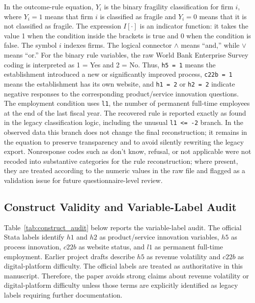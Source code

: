 In the outcome-rule equation, $Y_i$ is the binary fragility classification for firm $i$, where $Y_i = 1$ means that firm $i$ is classified as fragile and $Y_i = 0$ means that it is not classified as fragile. The expression $I[\cdot]$ is an indicator function: it takes the value 1 when the condition inside the brackets is true and 0 when the condition is false. The symbol $i$ indexes firms. The logical connector $\land$ means ``and,'' while $\lor$ means ``or.'' For the binary rule variables, the raw World Bank Enterprise Survey coding is interpreted as 1 = Yes and 2 = No. Thus, \texttt{h5 = 1} means the establishment introduced a new or significantly improved process, \texttt{c22b = 1} means the establishment has its own website, and \texttt{h1 = 2} or \texttt{h2 = 2} indicate negative responses to the corresponding product/service innovation questions. The employment condition uses \texttt{l1}, the number of permanent full-time employees at the end of the last fiscal year. The recovered rule is reported exactly as found in the legacy classification logic, including the unusual \texttt{l1 <= -2} branch. In the observed data this branch does not change the final reconstruction; it remains in the equation to preserve transparency and to avoid silently rewriting the legacy export. Nonresponse codes such as don't know, refusal, or not applicable were not recoded into substantive categories for the rule reconstruction; where present, they are treated according to the numeric values in the raw file and flagged as a validation issue for future questionnaire-level review.

\subsection{Construct Validity and Variable-Label Audit}

Table~\ref{tab:construct_audit} below reports the variable-label audit. The official Stata labels identify $h1$ and $h2$ as product/service innovation variables, $h5$ as process innovation, $c22b$ as website status, and $l1$ as permanent full-time employment. Earlier project drafts describe $h5$ as revenue volatility and $c22b$ as digital-platform difficulty. The official labels are treated as authoritative in this manuscript. Therefore, the paper avoids strong claims about revenue volatility or digital-platform difficulty unless those terms are explicitly identified as legacy labels requiring further documentation.

\small
\setlength{\tabcolsep}{4pt}
\setlength{\LTleft}{0pt}
\setlength{\LTright}{0pt}

\normalsize

